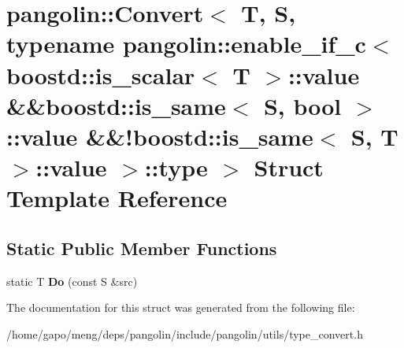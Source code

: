 \hypertarget{structpangolin_1_1_convert_3_01_t_00_01_s_00_01typename_01pangolin_1_1enable__if__c_3_01boostd_199ff7ea2c1912b7457b88f7ead1b4239}{}\section{pangolin\+:\+:Convert$<$ T, S, typename pangolin\+:\+:enable\+\_\+if\+\_\+c$<$ boostd\+:\+:is\+\_\+scalar$<$ T $>$\+:\+:value \&\&boostd\+:\+:is\+\_\+same$<$ S, bool $>$\+:\+:value \&\&!boostd\+:\+:is\+\_\+same$<$ S, T $>$\+:\+:value $>$\+:\+:type $>$ Struct Template Reference}
\label{structpangolin_1_1_convert_3_01_t_00_01_s_00_01typename_01pangolin_1_1enable__if__c_3_01boostd_199ff7ea2c1912b7457b88f7ead1b4239}
\subsection*{Static Public Member Functions}
\begin{DoxyCompactItemize}
\item 
static T {\bfseries Do} (const S \&src)\hypertarget{structpangolin_1_1_convert_3_01_t_00_01_s_00_01typename_01pangolin_1_1enable__if__c_3_01boostd_199ff7ea2c1912b7457b88f7ead1b4239_a45308ee5f160c3740a792cbebd966be2}{}\label{structpangolin_1_1_convert_3_01_t_00_01_s_00_01typename_01pangolin_1_1enable__if__c_3_01boostd_199ff7ea2c1912b7457b88f7ead1b4239_a45308ee5f160c3740a792cbebd966be2}

\end{DoxyCompactItemize}


The documentation for this struct was generated from the following file\+:\begin{DoxyCompactItemize}
\item 
/home/gapo/meng/deps/pangolin/include/pangolin/utils/type\+\_\+convert.\+h\end{DoxyCompactItemize}
